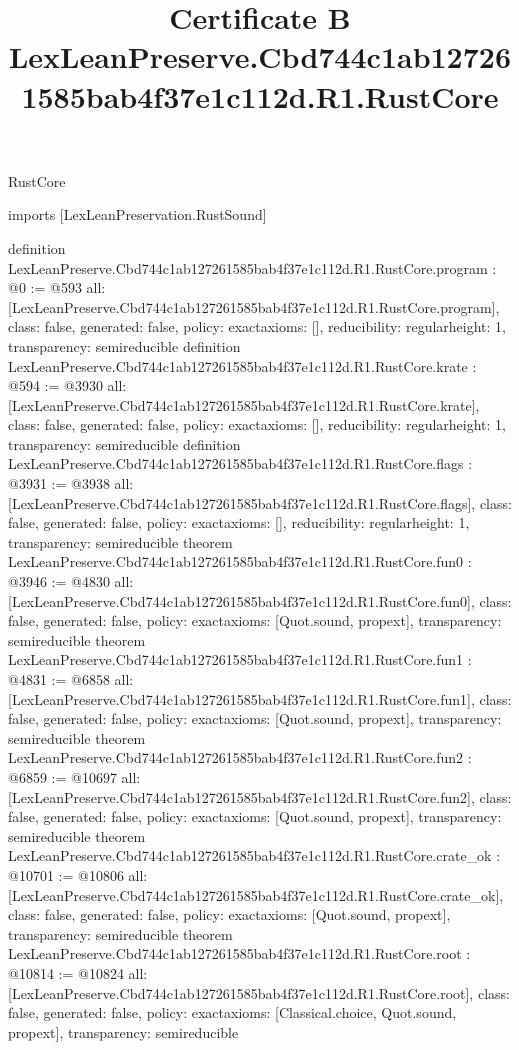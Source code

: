 \begin{lexlean}{RustCore}
\title{Certificate B LexLeanPreserve.Cbd744c1ab127261585bab4f37e1c112d.R1.RustCore}
\begin{coremodule}
imports [LexLeanPreservation.RustSound]

definition LexLeanPreserve.Cbd744c1ab127261585bab4f37e1c112d.R1.RustCore.program : @0 := @593 {
  all: [LexLeanPreserve.Cbd744c1ab127261585bab4f37e1c112d.R1.RustCore.program],
  class: false,
  generated: false,
  policy: exact{axioms: []},
  reducibility: regular{height: 1},
  transparency: semireducible
}
definition LexLeanPreserve.Cbd744c1ab127261585bab4f37e1c112d.R1.RustCore.krate : @594 := @3930 {
  all: [LexLeanPreserve.Cbd744c1ab127261585bab4f37e1c112d.R1.RustCore.krate],
  class: false,
  generated: false,
  policy: exact{axioms: []},
  reducibility: regular{height: 1},
  transparency: semireducible
}
definition LexLeanPreserve.Cbd744c1ab127261585bab4f37e1c112d.R1.RustCore.flags : @3931 := @3938 {
  all: [LexLeanPreserve.Cbd744c1ab127261585bab4f37e1c112d.R1.RustCore.flags],
  class: false,
  generated: false,
  policy: exact{axioms: []},
  reducibility: regular{height: 1},
  transparency: semireducible
}
theorem LexLeanPreserve.Cbd744c1ab127261585bab4f37e1c112d.R1.RustCore.fun0 : @3946 := @4830 {
  all: [LexLeanPreserve.Cbd744c1ab127261585bab4f37e1c112d.R1.RustCore.fun0],
  class: false,
  generated: false,
  policy: exact{axioms: [Quot.sound, propext]},
  transparency: semireducible
}
theorem LexLeanPreserve.Cbd744c1ab127261585bab4f37e1c112d.R1.RustCore.fun1 : @4831 := @6858 {
  all: [LexLeanPreserve.Cbd744c1ab127261585bab4f37e1c112d.R1.RustCore.fun1],
  class: false,
  generated: false,
  policy: exact{axioms: [Quot.sound, propext]},
  transparency: semireducible
}
theorem LexLeanPreserve.Cbd744c1ab127261585bab4f37e1c112d.R1.RustCore.fun2 : @6859 := @10697 {
  all: [LexLeanPreserve.Cbd744c1ab127261585bab4f37e1c112d.R1.RustCore.fun2],
  class: false,
  generated: false,
  policy: exact{axioms: [Quot.sound, propext]},
  transparency: semireducible
}
theorem LexLeanPreserve.Cbd744c1ab127261585bab4f37e1c112d.R1.RustCore.crate_ok : @10701 := @10806 {
  all: [LexLeanPreserve.Cbd744c1ab127261585bab4f37e1c112d.R1.RustCore.crate_ok],
  class: false,
  generated: false,
  policy: exact{axioms: [Quot.sound, propext]},
  transparency: semireducible
}
theorem LexLeanPreserve.Cbd744c1ab127261585bab4f37e1c112d.R1.RustCore.root : @10814 := @10824 {
  all: [LexLeanPreserve.Cbd744c1ab127261585bab4f37e1c112d.R1.RustCore.root],
  class: false,
  generated: false,
  policy: exact{axioms: [Classical.choice, Quot.sound, propext]},
  transparency: semireducible
}


\end{coremodule}
\end{lexlean}
